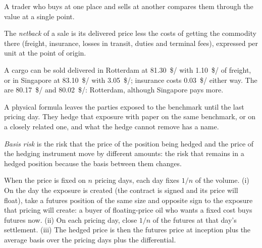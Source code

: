 A trader who buys at one place and sells at another compares them through the
value at a single point.

\begin{definition}[Netback]\label{def:m3:physical-commodity-markets:netback}
The \emph{netback} of a sale is its delivered price less the costs of
getting the commodity there (freight, insurance, losses in transit, duties and
terminal fees), expressed per unit at the point of origin.
\end{definition}

\begin{example}\label{ex:m3:physical-commodity-markets:netback}
A cargo can be sold delivered in Rotterdam at \qty{81.30}{\$/\barrel} with
\qty{1.10}{\$/\barrel} of freight, or in Singapore at \qty{83.10}{\$/\barrel} with
\qty{3.05}{\$/\barrel}; insurance costs \qty{0.03}{\$/\barrel} either way. The
 are \qty{80.17}{\$/\barrel} and \qty{80.02}{\$/\barrel}: Rotterdam, although
Singapore pays more.
\end{example}

A physical formula leaves the parties exposed to the benchmark until the last
pricing day. They hedge that exposure with paper on the same benchmark, or on a
closely related one, and what the hedge cannot remove has a name.

\begin{definition}\label{def:m3:physical-commodity-markets:basisrisk}
\emph{Basis risk} is the risk that the price of the position
being hedged and the price of the hedging instrument move by different amounts: the
risk that remains in a hedged position because the basis between them changes.
\end{definition}

\begin{method}\label{met:m3:physical-commodity-markets:hedge}
When the price is fixed on $n$ pricing days, each day fixes $1/n$ of the volume.
(i) On the day the exposure is created (the contract is signed and its price will
float), take a futures position of the same size and opposite sign to the exposure
that pricing will create: a buyer of floating-price oil who wants a fixed cost buys
futures now. (ii) On each pricing day, close $1/n$ of the futures at that day's
settlement. (iii) The hedged price is then the futures price at inception plus the
average basis over the pricing days plus the differential.
\end{method}

